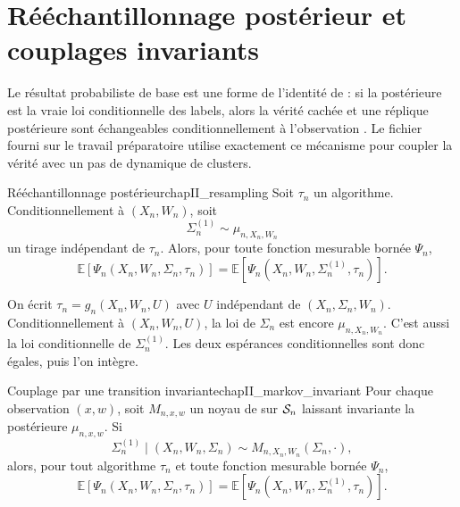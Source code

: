 \section{Rééchantillonnage postérieur et couplages invariants}
\label{sec:chapII_couplage}

Le résultat probabiliste de base est une forme de l'identité de  : si la postérieure est la vraie loi conditionnelle des labels, alors la vérité cachée et une réplique postérieure sont échangeables conditionnellement à l'observation \cite{Nishimori1980,Nishimori2001}. Le fichier fourni sur le travail préparatoire utilise exactement ce mécanisme pour coupler la vérité avec un pas de dynamique de clusters.

\begin{Theoreme}{Rééchantillonnage postérieur}{chapII_resampling}
Soit $\tau_n$ un algorithme. Conditionnellement à $(X_n,W_n)$, soit
\[
    \Sigma_n^{(1)}\sim\mu_{n,X_n,W_n}
\]
un tirage indépendant de $\tau_n$. Alors, pour toute fonction mesurable bornée $\Psi_n$,
\begin{equation}
    \mathbb E\left[\Psi_n(X_n,W_n,\Sigma_n,\tau_n)\right]
    =
    \mathbb E\left[\Psi_n(X_n,W_n,\Sigma_n^{(1)},\tau_n)\right].
    \label{eq:chapII_resampling}
\end{equation}
\end{Theoreme}

\begin{Preuve}
On écrit $\tau_n=g_n(X_n,W_n,U)$ avec $U$ indépendant de $(X_n,\Sigma_n,W_n)$. Conditionnellement à $(X_n,W_n,U)$, la loi de $\Sigma_n$ est encore $\mu_{n,X_n,W_n}$. C'est aussi la loi conditionnelle de $\Sigma_n^{(1)}$. Les deux espérances conditionnelles sont donc égales, puis l'on intègre.
\end{Preuve}

\begin{Theoreme}{Couplage par une transition invariante}{chapII_markov_invariant}
Pour chaque observation $(x,w)$, soit $M_{n,x,w}$ un noyau de  sur $\mathcal S_n$ laissant invariante la postérieure $\mu_{n,x,w}$. Si
\[
    \Sigma_n^{(1)}\mid (X_n,W_n,\Sigma_n)
    \sim
    M_{n,X_n,W_n}(\Sigma_n,\cdot),
\]
alors, pour tout algorithme $\tau_n$ et toute fonction mesurable bornée $\Psi_n$,
\begin{equation}
    \mathbb E\left[\Psi_n(X_n,W_n,\Sigma_n,\tau_n)\right]
    =
    \mathbb E\left[\Psi_n(X_n,W_n,\Sigma_n^{(1)},\tau_n)\right].
    \label{eq:chapII_markov_coupling}
\end{equation}
\end{Theoreme}

